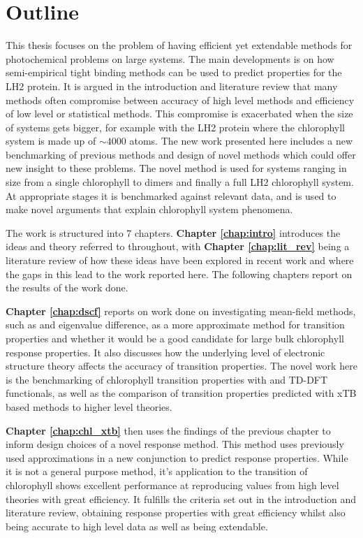 %
%
\chapter{Outline}
\label{chap:outline}

This thesis focuses on the problem of having efficient yet extendable methods for
photochemical problems on large systems. The main developments is on how semi-empirical
tight binding methods can be used to predict properties for the LH2 protein. It 
is argued in the introduction and literature review that many methods often compromise
between accuracy of high level methods and efficiency of low level or statistical 
methods. This compromise is exacerbated when the size of systems gets bigger, for
example with the LH2 protein where the chlorophyll system is made up of $\sim 4000$
atoms. The new work presented here includes a new benchmarking of previous methods
and design of novel methods which could offer new insight to these problems. The
novel method is used for systems ranging in size from a single chlorophyll to dimers
and finally a full LH2 chlorophyll system. At appropriate stages it is benchmarked
against relevant data, and is used to make novel arguments that explain chlorophyll
system phenomena.

The work is structured into 7 chapters. \textbf{Chapter \ref{chap:intro}} introduces
the ideas and theory referred to throughout, with \textbf{Chapter \ref{chap:lit_rev}} 
being a literature review of how these ideas have been explored in recent work and
where the gaps in this lead to the work reported here. The following chapters report
on the results of the work done.

\textbf{Chapter \ref{chap:dscf}} reports on work done on investigating
mean-field methods, such as \dscf and eigenvalue difference, as a more approximate
method for transition properties and whether it would be a good candidate for large
bulk chlorophyll response properties. It also discusses how the underlying level
of electronic structure theory affects the accuracy of transition properties. The
novel work here is the benchmarking of chlorophyll transition properties with \dscf
and TD-DFT functionals, as well as the comparison of transition properties predicted
with xTB based methods to higher level theories.

\textbf{Chapter \ref{chap:chl_xtb}} then uses the findings of the previous chapter to inform
design choices of a novel response method. This method uses previously used approximations
in a new conjunction to predict response properties. While it is not a general 
purpose method, it's application to the \Qy transition of chlorophyll shows excellent
performance at reproducing values from high level theories with great efficiency.
It fulfills the criteria set out in the introduction and literature review, obtaining
response properties with great efficiency whilst also being accurate to high level
data as well as being extendable.

